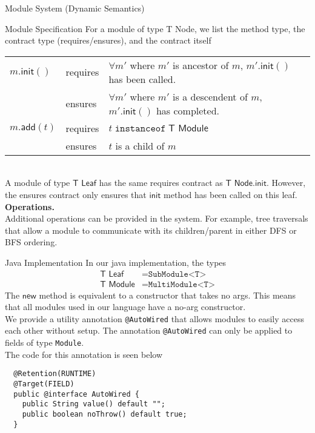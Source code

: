 \documentclass[11pt]{article}
\begin{document}
\begin{section}{Module System (Dynamic Semantics)}
\begin{subsection}{Module Specification}
For a module of type \textsf{T Node}, we list the method type, the contract type (requires/ensures), and the contract itself\\

\begin{tabularx}{\linewidth}{l l X}
$m.\textsf{init}()$ & requires & $\forall m'$ where $m'$ is ancestor of $m$, $m'.\textsf{init}()$ has been called. \\
& ensures & $\forall m'$ where $m'$ is a descendent of $m$, $m'.\textsf{init}()$ has completed.\\
$m.\textsf{add}(t)$ & requires & $t\;\texttt{instanceof}\;\textsf{T Module}$\\
& ensures & $t$ is a child of $m$
\end{tabularx}\\

A module of type $\textsf{T Leaf}$ has the same requires contract as $\textsf{T Node.init}$. However, the ensures contract only ensures that $\textsf{init}$ method has been called on this leaf.\\

\textbf{Operations.}\medskip\\
Additional operations can be provided in the system. For example, tree traversals that allow a module to communicate with its children/parent in either DFS or BFS ordering. 
\end{subsection}
\begin{subsection}{Java Implementation}
In our java implementation, the types
\begin{align*}
\textsf{T Leaf} &= \texttt{SubModule<T>}\\
\textsf{T Module} &= \texttt{MultiModule<T>}
\end{align*}
The $\textsf{new}$ method is equivalent to a constructor that takes no args. This means that all modules used in our language have a no-arg constructor.\\

We provide a utility annotation \verb|@AutoWired| that allows modules to easily access each other without 
setup. The annotation \verb|@AutoWired| can only be applied to fields of type \verb|Module|.\\

The code for this annotation is seen below
\begin{verbatim}
  @Retention(RUNTIME)
  @Target(FIELD)
  public @interface AutoWired {
    public String value() default "";
    public boolean noThrow() default true;
  }
\end{verbatim}


\end{subsection}
\end{section}
\end{document}
